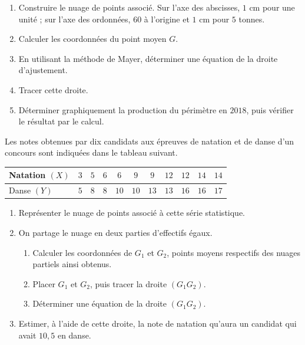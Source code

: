 \begin{annales}
\begin{enumerate}[label=\textbf{\arabic*)}, leftmargin=*, itemsep=0.15em]
  \item Construire le nuage de points associé. Sur l'axe des abscisses,
        $1$ cm pour une unité ; sur l'axe des ordonnées, $60$ à l'origine et
        $1$ cm pour $5$ tonnes.
  \item Calculer les coordonnées du point moyen $G$.
  \item En utilisant la méthode de Mayer, déterminer une équation de la
        droite d'ajustement.
  \item Tracer cette droite.
  \item Déterminer graphiquement la production du périmètre en $2018$, puis
        vérifier le résultat par le calcul.
\end{enumerate}

Les notes obtenues par dix candidats aux épreuves de natation et de danse
d'un concours sont indiquées dans le tableau suivant.

\begin{center}\footnotesize
\renewcommand{\arraystretch}{1.25}
\begin{tabular}{|l|c|c|c|c|c|c|c|c|c|c|}
\hline
Natation $(X)$ & $3$ & $5$ & $6$ & $6$ & $9$ & $9$ & $12$ & $12$ & $14$ &
$14$\\
\hline
Danse $(Y)$ & $5$ & $8$ & $8$ & $10$ & $10$ & $13$ & $13$ & $16$ & $16$ &
$17$\\
\hline
\end{tabular}
\end{center}

\begin{enumerate}[label=\textbf{\arabic*)}, leftmargin=*, itemsep=0.15em]
  \item Représenter le nuage de points associé à cette série statistique.
  \item On partage le nuage en deux parties d'effectifs égaux.
        \begin{enumerate}[label=\textbf{\alph*)}, leftmargin=1.4em]
          \item Calculer les coordonnées de $G_{1}$ et $G_{2}$, points
                moyens respectifs des nuages partiels ainsi obtenus.
          \item Placer $G_{1}$ et $G_{2}$, puis tracer la droite
                $\left(G_{1}G_{2}\right)$.
          \item Déterminer une équation de la droite
                $\left(G_{1}G_{2}\right)$.
        \end{enumerate}
  \item Estimer, à l'aide de cette droite, la note de natation qu'aura un
        candidat qui avait $10{,}5$ en danse.
\end{enumerate}


\end{annales}
